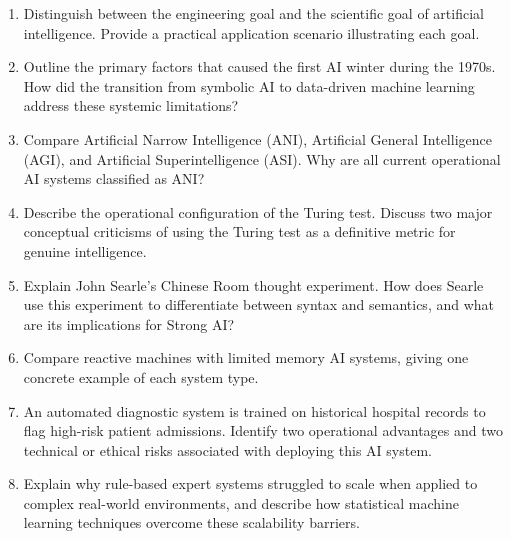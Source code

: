 \documentclass[12pt]{report}
\begin{document}
\begin{enumerate}
    \item Distinguish between the engineering goal and the scientific goal of artificial intelligence. Provide a practical application scenario illustrating each goal.
    \item Outline the primary factors that caused the first AI winter during the 1970s. How did the transition from symbolic AI to data-driven machine learning address these systemic limitations?
    \item Compare Artificial Narrow Intelligence (ANI), Artificial General Intelligence (AGI), and Artificial Superintelligence (ASI). Why are all current operational AI systems classified as ANI?
    \item Describe the operational configuration of the Turing test. Discuss two major conceptual criticisms of using the Turing test as a definitive metric for genuine intelligence.
    \item Explain John Searle's Chinese Room thought experiment. How does Searle use this experiment to differentiate between syntax and semantics, and what are its implications for Strong AI?
    \item Compare reactive machines with limited memory AI systems, giving one concrete example of each system type.
    \item An automated diagnostic system is trained on historical hospital records to flag high-risk patient admissions. Identify two operational advantages and two technical or ethical risks associated with deploying this AI system.
    \item Explain why rule-based expert systems struggled to scale when applied to complex real-world environments, and describe how statistical machine learning techniques overcome these scalability barriers.
\end{enumerate}
\end{document}
